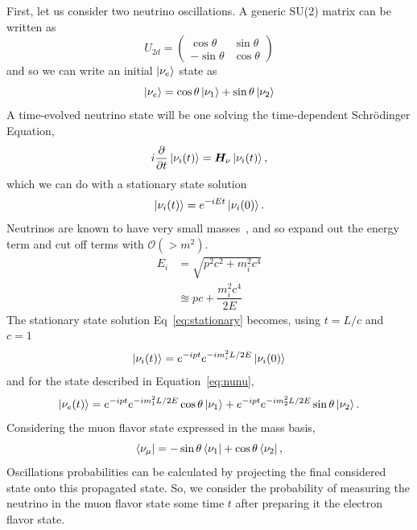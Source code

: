 \documentclass[main.tex]{subfiles}
\begin{document}
First, let us consider two neutrino oscillations.
A generic SU(2) matrix can be written as 
\begin{equation}
    U_{2d}=\left(\begin{array}{cc} \cos\theta & \sin\theta \\ -\sin\theta & \cos\theta \end{array}\right)
\end{equation}
and so we can write an initial $\left| \nu_{e} \right >$ state as 
\begin{equation}\label{eq:nunu}
    \left| \nu_{e} \right > = \cos\theta \left| \nu_{1} \right > + \sin\theta \left| \nu_{2} \right > 
\end{equation}
A time-evolved neutrino state will be one solving the time-dependent Schr\"odinger Equation,
\begin{equation}
    i\dfrac{\partial}{\partial t} \left| \nu_{i} (t) \right > = \bm{H}_{\nu}\left| \nu_{i}(t) \right >,
\end{equation}
which we can do with a stationary state solution
\begin{equation}\label{eq:stationary}
    \left| \nu_{i} (t) \right >  =  e^{-iEt} \left| \nu_{i} (0) \right >.
\end{equation}
Neutrinos are known to have very small masses~\cite{KATRIN:2021uub}, and so expand out the energy term and cut off terms with $\mathcal{O}(>m^{2})$. 
\begin{align}
    E_{i} &= \sqrt{p^{2}c^{2} + m_{i}^{2}c^{4}} \\
    &\approxeq pc + \dfrac{m_{i}^{2}c^{4}}{2E}
\end{align}
The stationary state solution Eq~\eqref{eq:stationary} becomes, using $t=L/c$ and $c=1$ 
\begin{equation}
    \left| \nu_{i} (t) \right >  =  e^{-ipt}e^{ -im_{i}^{2}L/2E}\left| \nu_{i} (0) \right >
\end{equation}
and for the state described in Equation~\eqref{eq:nunu},
\begin{equation}
    \left| \nu_{e}(t) \right > = e^{-ipt}e^{ -im_{1}^{2}L/2E} \cos\theta \left| \nu_{1} \right >  + e^{-ipt}e^{ -im_{2}^{2}L/2E} \sin\theta \left| \nu_{2} \right >.
\end{equation}
Considering the muon flavor state expressed in the mass basis,
\begin{equation}
    \left< \nu_{\mu} \right | = -\sin\theta\left< \nu_{1} \right | + \cos\theta\left< \nu_{2} \right |,
\end{equation}
Oscillations probabilities can be calculated by projecting the final considered state onto this propagated state.
So, we consider the probability of measuring the neutrino in the muon flavor state some time $t$ after preparing it the electron flavor state. 
\end{document}
